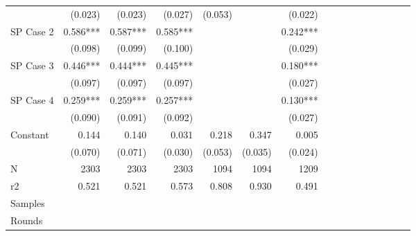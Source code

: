 \begin{tabular}{@{\extracolsep{5pt}}lrrrrrrrrrrrrrrr}
& (0.023)\phantom{***} & (0.023)\phantom{***} & (0.027)\phantom{***} & (0.053)\phantom{***} & \phantom{***} & (0.022)\phantom{***} \\
SP Case 2 & 0.586\phantom{)}*** & 0.587\phantom{)}*** & 0.585\phantom{)}*** & \phantom{***} & \phantom{***} & 0.242\phantom{)}*** \\
& (0.098)\phantom{***} & (0.099)\phantom{***} & (0.100)\phantom{***} & \phantom{***} & \phantom{***} & (0.029)\phantom{***} \\
SP Case 3 & 0.446\phantom{)}*** & 0.444\phantom{)}*** & 0.445\phantom{)}*** & \phantom{***} & \phantom{***} & 0.180\phantom{)}*** \\
& (0.097)\phantom{***} & (0.097)\phantom{***} & (0.097)\phantom{***} & \phantom{***} & \phantom{***} & (0.027)\phantom{***} \\
SP Case 4 & 0.259\phantom{)}*** & 0.259\phantom{)}*** & 0.257\phantom{)}*** & \phantom{***} & \phantom{***} & 0.130\phantom{)}*** \\
& (0.090)\phantom{***} & (0.091)\phantom{***} & (0.092)\phantom{***} & \phantom{***} & \phantom{***} & (0.027)\phantom{***} \\
Constant & 0.144\phantom{\phantom{)}***} & 0.140\phantom{\phantom{)}***} & 0.031\phantom{\phantom{)}***} & 0.218\phantom{\phantom{)}***} & 0.347\phantom{\phantom{)}***} & 0.005\phantom{\phantom{)}***} \\
& (0.070)\phantom{***} & (0.071)\phantom{***} & (0.030)\phantom{***} & (0.053)\phantom{***} & (0.035)\phantom{***} & (0.024)\phantom{***} \\
\hline
N & 2303\phantom{***} & 2303\phantom{***} & 2303\phantom{***} & 1094\phantom{***} & 1094\phantom{***} & 1209\phantom{***} \\
r2 & 0.521\phantom{***} & 0.521\phantom{***} & 0.573\phantom{***} & 0.808\phantom{***} & 0.930\phantom{***} & 0.491\phantom{***} \\
{Samples}} & \multicolumn{1}{p{0.13\linewidth}}{\centering{All}} & \multicolumn{1}{p{0.13\linewidth}}{\centering{All}} & \multicolumn{1}{p{0.13\linewidth}}{\centering{All}} & \multicolumn{1}{p{0.13\linewidth}}{\centering{All ex. 4}} & \multicolumn{1}{p{0.13\linewidth}}{\centering{All ex. 4}} & \multicolumn{1}{p{0.13\linewidth}}{\centering{All ex. 2b}} \\
{Rounds}} & \multicolumn{1}{p{0.13\linewidth}}{\centering{All}} & \multicolumn{1}{p{0.13\linewidth}}{\centering{All}} & \multicolumn{1}{p{0.13\linewidth}}{\centering{All}} & \multicolumn{1}{p{0.13\linewidth}}{\centering{All}} & \multicolumn{1}{p{0.13\linewidth}}{\centering{All}} \\

\end{tabular}
